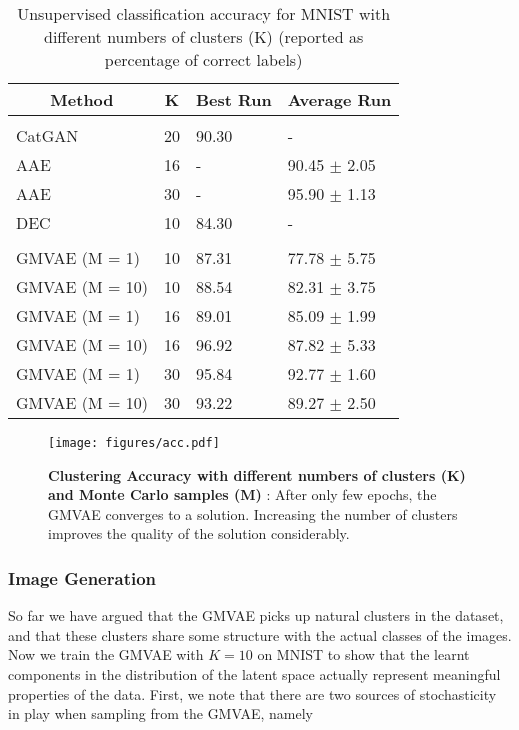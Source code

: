 \documentclass{article} \usepackage{iclr2017_conference,times}
\begin{document}
\begin{table}[t]
\caption{Unsupervised classification accuracy for MNIST with different numbers of clusters (K) (reported as percentage of correct labels)}
\label{table:mnist-cluster-table}
\centering
\begin{tabular}{llll}
\multicolumn{1}{c}{\bf Method}  &\multicolumn{1}{c}{\bf K}		&\multicolumn{1}{c}{\bf Best Run } &\multicolumn{1}{c}{\bf Average Run}
\\ \hline \\
CatGAN \citep{springenberg2015unsupervised} &20	& 90.30 & - \\
AAE \citep{makhzani2015adversarial}&16& - & 90.45 $\pm$ 2.05\\
AAE \citep{makhzani2015adversarial} &30	&-& 95.90 $\pm$ 1.13 \\
DEC  \citep{xie2015unsupervised} &10 & 84.30 & - \\
\\
GMVAE (M = 1) & 10  & 87.31 &  77.78 $\pm$ 5.75 \\
GMVAE (M = 10) & 10 & 88.54  & 82.31 $\pm$ 3.75 \\
GMVAE (M = 1) &16 &	89.01 & 85.09 $\pm$ 1.99  \\
GMVAE (M = 10) &16 & 96.92  & 87.82 $\pm$ 5.33 	\\
GMVAE (M = 1) &30 &	95.84 & 92.77 $\pm$ 1.60 \\
GMVAE (M = 10) &30 & 93.22 & 89.27 $\pm$ 2.50	\\
\end{tabular}
\end{table}

\begin{figure}[h]
\centering
 \texttt{[image: figures/acc.pdf]}
\caption{\textbf{Clustering Accuracy with different numbers of clusters (K) and Monte Carlo samples (M)} : After only few epochs, the GMVAE converges to a solution. Increasing the number of clusters improves the quality of the solution considerably.}
\label{fig:acc}
\end{figure}

\subsubsection{Image Generation}
So far we have argued that the GMVAE picks up natural clusters in the dataset, and that these clusters share some structure with the actual classes of the images. Now we train the GMVAE with $K = 10$ on MNIST to show that the learnt components in the distribution of the latent space actually represent meaningful properties of the data. First, we note that there are two sources of stochasticity in play when sampling from the GMVAE, namely
\end{document}
